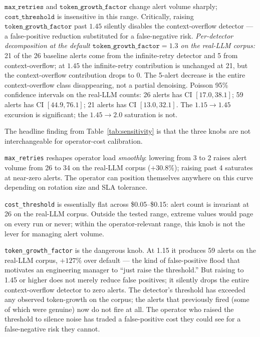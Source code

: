 \documentclass[journal]{IEEEtran}
\begin{document}
\begin{table}[t]
\footnotesize $\texttt{max\_retries}$ and $\texttt{token\_growth\_factor}$ change alert volume sharply; $\texttt{cost\_threshold}$ is insensitive in this range. Critically, raising $\texttt{token\_growth\_factor}$ past $1.45$ silently disables the context-overflow detector --- a false-positive reduction substituted for a false-negative risk. \emph{Per-detector decomposition at the default $\texttt{token\_growth\_factor}{=}1.3$ on the real-LLM corpus:} 21 of the 26 baseline alerts come from the infinite-retry detector and 5 from context-overflow; at $1.45$ the infinite-retry contribution is unchanged at 21, but the context-overflow contribution drops to 0. The 5-alert decrease is the entire context-overflow class disappearing, not a partial denoising. Poisson 95\% confidence intervals on the real-LLM counts: 26 alerts has CI $[17.0, 38.1]$; 59 alerts has CI $[44.9, 76.1]$; 21 alerts has CI $[13.0, 32.1]$. The $1.15 \to 1.45$ excursion is significant; the $1.45 \to 2.0$ saturation is not.
\end{table}

The headline finding from Table~\ref{tab:sensitivity} is that the three knobs are not interchangeable for operator-cost calibration.

\texttt{max\_retries} reshapes operator load \emph{smoothly}: lowering from 3 to 2 raises alert volume from 26 to 34 on the real-LLM corpus ($+30.8\%$); raising past 4 saturates at near-zero alerts. The operator can position themselves anywhere on this curve depending on rotation size and SLA tolerance.

\texttt{cost\_threshold} is essentially flat across \$0.05--\$0.15: alert count is invariant at 26 on the real-LLM corpus. Outside the tested range, extreme values would page on every run or never; within the operator-relevant range, this knob is not the lever for managing alert volume.

\texttt{token\_growth\_factor} is the dangerous knob. At 1.15 it produces 59 alerts on the real-LLM corpus, $+127\%$ over default --- the kind of false-positive flood that motivates an engineering manager to ``just raise the threshold.'' But raising to 1.45 or higher does not merely reduce false positives; it silently drops the entire context-overflow detector to zero alerts. The detector's threshold has exceeded any observed token-growth on the corpus; the alerts that previously fired (some of which were genuine) now do not fire at all. The operator who raised the threshold to silence noise has traded a false-positive cost they could see for a false-negative risk they cannot.
\end{document}
